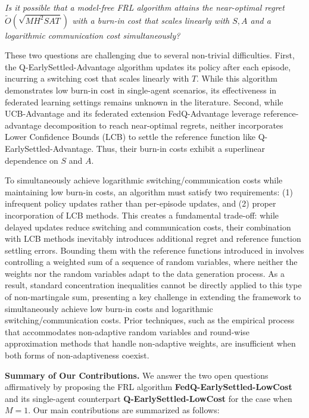 \documentclass{article}
\begin{document}
\begin{center}
    \textit{Is it possible that a model-free FRL algorithm attains the near-optimal regret $\tilde{O}(\sqrt{MH^2SAT})$ with a burn-in cost that scales linearly with $S, A$ and a logarithmic communication cost simultaneously?}
\end{center}
These two questions are challenging due to several non-trivial difficulties. First, the Q-EarlySettled-Advantage algorithm \cite{li2023breaking} updates its policy after each episode, incurring a switching cost that scales linearly with $T$. While this algorithm demonstrates low burn-in cost in single-agent scenarios, its effectiveness in federated learning settings remains unknown in the literature. Second, while UCB-Advantage \cite{zhang2020almost} and its federated extension FedQ-Advantage \cite{zheng2024federated} leverage reference-advantage decomposition to reach near-optimal regrets, neither incorporates Lower Confidence Bounds (LCB) to settle the reference function like Q-EarlySettled-Advantage. Thus, their burn-in costs exhibit a superlinear dependence on $S$ and $A$.

To simultaneously achieve logarithmic switching/communication costs while maintaining low burn-in costs, an algorithm must satisfy two requirements: (1) infrequent policy updates rather than per-episode updates, and (2) proper incorporation of LCB methods. This creates a fundamental trade-off: while delayed updates reduce switching and communication costs, their combination with LCB methods inevitably introduces additional regret and reference function settling errors. Bounding them with the reference functions introduced in \cite{li2023breaking, zhang2020almost} involves controlling a weighted sum of a sequence of random variables, where neither the weights nor the random variables adapt to the data generation process. As a result, standard concentration inequalities cannot be directly applied to this type of non-martingale sum, presenting a key challenge in extending the framework to simultaneously achieve low burn-in costs and logarithmic switching/communication costs. Prior techniques,
such as the empirical process \citep{li2023breaking} that accommodates non-adaptive random variables and round-wise approximation methods \citep{zhang2025gapdependent,zheng2023federated, zheng2024federated} that handle non-adaptive weights, are insufficient when both forms of non-adaptiveness coexist.

\textbf{Summary of Our Contributions.} We answer the two open questions affirmatively by proposing the FRL algorithm \textbf{FedQ-EarlySettled-LowCost} and its single-agent counterpart \textbf{Q-EarlySettled-LowCost} for the case when $M = 1$. Our main contributions are summarized as follows:
\end{document}
